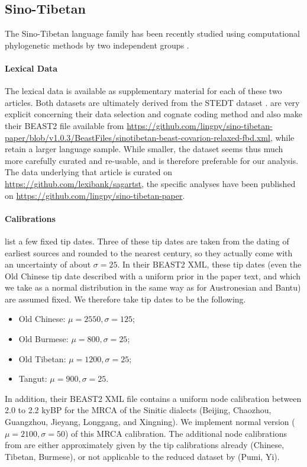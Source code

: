 \documentclass[]{rsos}%
\begin{document}
\subsection{Sino-Tibetan}\label{s:sinotibetan}
The Sino-Tibetan language family has been recently studied using computational phylogenetic methods by two independent groups
\parencite{sagart2019dated,zhang2019phylogenetic}.
\paragraph{Lexical Data}
The lexical data is available as supplementary material for each of these two
articles. Both datasets are ultimately derived from the STEDT dataset
\parencite{stedt}.  are very explicit concerning their
data selection and cognate coding method and also make their BEAST2 file available from \url{https://github.com/lingpy/sino-tibetan-paper/blob/v1.0.3/BeastFiles/sinotibetan-beast-covarion-relaxed-fbd.xml}, while
 retain a larger language sample.
While smaller, the \textcite{sagart2019dated} dataset seems thus much more carefully
curated and re-usable, and is therefore preferable for our analysis.
The data underlying that article is curated on \url{https://github.com/lexibank/sagartst}, the specific analyses have been published on \url{https://github.com/lingpy/sino-tibetan-paper}.

\paragraph{Calibrations}
\Textcite{sagart2019dated} list a few fixed tip dates. Three of these tip dates are taken from the dating of earliest sources and rounded to the nearest century, so they actually come with an uncertainty of about $\sigma=25$. In their BEAST2 XML, these tip dates (even the Old Chinese tip date described with a uniform prior in the paper text, and which we take as a normal distribution in the same way as for Austronesian and Bantu) are assumed fixed.
We therefore take tip dates to be the following.
\begin{itemize}
    \item Old Chinese: $\mu=2550, \sigma=125$;
    \item Old Burmese: $\mu=800, \sigma=25$;
    \item Old Tibetan: $\mu=1200, \sigma=25$;
    \item Tangut: $\mu=900, \sigma=25$.
\end{itemize}
In addition, their BEAST2 XML file contains a uniform node calibration between 2.0 to 2.2 kyBP for the MRCA of the Sinitic dialects (Beijing, Chaozhou, Guangzhou, Jieyang, Longgang, and Xingning). We implement normal version ($\mu=2100, \sigma=50$) of this MRCA calibration.
The additional node calibrations from \textcite{zhang2019phylogenetic} are either approximately given by the tip calibrations already (Chinese, Tibetan, Burmese), or not applicable to the reduced dataset by \textcite{sagart2019dated} (Pumi, Yi).
\end{document}
